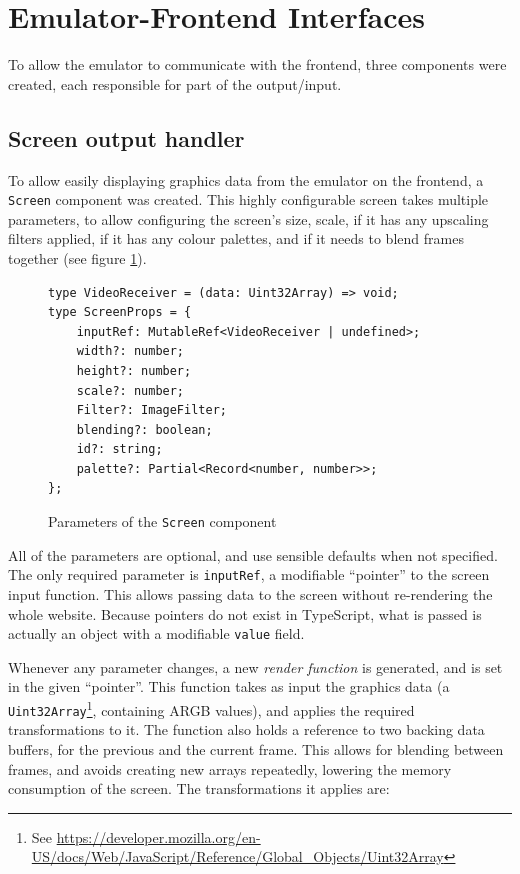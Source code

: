 \documentclass[11pt]{informatics-report}
\newcommand{\ftnt}[1]{\footnote{See \url{#1}}}
\begin{document}
\section{Emulator-Frontend Interfaces}

To allow the emulator to communicate with the frontend, three components were created, each responsible for part of the output/input.

\subsection{Screen output handler}

To allow easily displaying graphics data from the emulator on the frontend, a \texttt{Screen} component was created. This highly configurable screen takes multiple parameters, to allow configuring the screen's size, scale, if it has any upscaling filters applied, if it has any colour palettes, and if it needs to blend frames together (see figure \ref{fig:screen-params}).

\begin{figure}[h]
    \begin{verbatim}
type VideoReceiver = (data: Uint32Array) => void;
type ScreenProps = {
    inputRef: MutableRef<VideoReceiver | undefined>;
    width?: number;
    height?: number;
    scale?: number;
    Filter?: ImageFilter;
    blending?: boolean;
    id?: string;
    palette?: Partial<Record<number, number>>;
};
    \end{verbatim}
    \caption{Parameters of the \texttt{Screen} component}
    \label{fig:screen-params}
\end{figure}

All of the parameters are optional, and use sensible defaults when not specified. The only required parameter is \texttt{inputRef}, a modifiable ``pointer'' to the screen input function. This allows passing data to the screen without re-rendering the whole website. Because pointers do not exist in TypeScript, what is passed is actually an object with a modifiable \texttt{value} field.

Whenever any parameter changes, a new \textit{render function} is generated, and is set in the given ``pointer''. This function takes as input the graphics data (a \texttt{Uint32Array}\ftnt{https://developer.mozilla.org/en-US/docs/Web/JavaScript/Reference/Global_Objects/Uint32Array}, containing ARGB values), and applies the required transformations to it. The function also holds a reference to two backing data buffers, for the previous and the current frame. This allows for blending between frames, and avoids creating new arrays repeatedly, lowering the memory consumption of the screen. The transformations it applies are:
\end{document}
